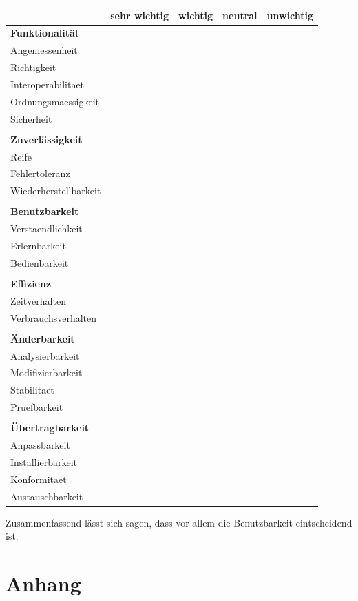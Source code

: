 \documentclass{article}
\newcommand{\xmark}{\ding{55}}
\begin{document}
\begin{table}[H]
  \begin{tabular}{| l | c | c | c | c |}
    \hline
     & \textbf{sehr wichtig} & \textbf{wichtig} & \textbf{neutral} & \textbf{unwichtig} \\ \hline
    \textbf{Funktionalität} &  &  &  & \\ \hline
    \gls{Angemessenheit} &  &  & \xmark & \\ \hline
    \gls{Richtigkeit} &  & \xmark &  & \\ \hline
    \gls{Interoperabilitaet} &  &  &  & \xmark \\ \hline
    \gls{Ordnungsmaessigkeit} &  &  & \xmark & \\ \hline
    \gls{Sicherheit} &  &  & \xmark & \\ \hline
     &  &  &  & \\ \hline
    \textbf{Zuverlässigkeit} &  &  &  & \\ \hline
    \gls{Reife} & & \xmark &  & \\ \hline
    \gls{Fehlertoleranz} & & \xmark &  & \\ \hline
    \gls{Wiederherstellbarkeit} &  &  & \xmark & \\ \hline
     &  &  &  & \\ \hline
    \textbf{Benutzbarkeit} &  &  &  & \\ \hline
    \gls{Verstaendlichkeit} & \xmark &  &  & \\ \hline
    \gls{Erlernbarkeit} & \xmark &  &  & \\ \hline
    \gls{Bedienbarkeit} & \xmark &  &  & \\ \hline
     &  &  &  & \\ \hline
    \textbf{Effizienz} &  &  &  & \\ \hline
    \gls{Zeitverhalten} &  &  & \xmark & \\ \hline
    \gls{Verbrauchsverhalten} &  &  & \xmark & \\ \hline
     &  &  &  & \\ \hline
    \textbf{Änderbarkeit} &  &  & \xmark & \\ \hline
    \gls{Analysierbarkeit} &  &  &  & \\ \hline
    \gls{Modifizierbarkeit} &  & \xmark &  & \\ \hline
    \gls{Stabilitaet} &  &  & \xmark & \\ \hline
    \gls{Pruefbarkeit} &  &  & \xmark & \\ \hline
     &  &  &  & \\ \hline
    \textbf{Übertragbarkeit} &  &  &  & \\ \hline
    \gls{Anpassbarkeit} &  &  & \xmark & \\ \hline
    \gls{Installierbarkeit} &  &  & \xmark & \\ \hline
    \gls{Konformitaet} &  &  & \xmark & \\ \hline
    \gls{Austauschbarkeit} &  &  & \xmark & \\ \hline
    \end{tabular}
\end{table}

Zusammenfassend lässt sich sagen, dass vor allem die Benutzbarkeit eintscheidend ist.


\section{Anhang}

\glsaddall
\printglossary[numberedsection, style=altlist]
\end{document}
